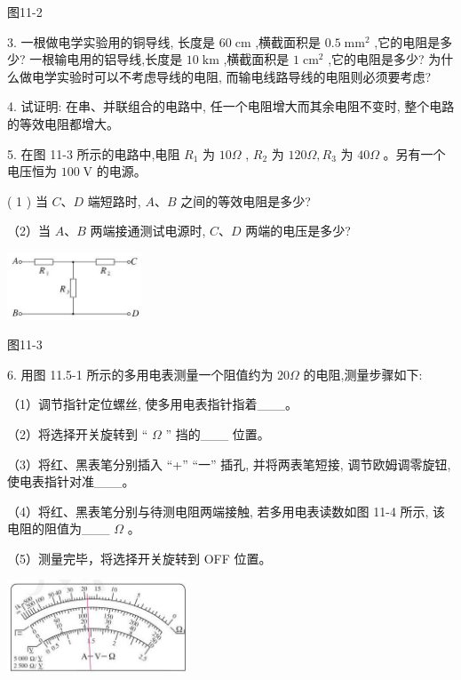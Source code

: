 \documentclass[10pt]{article}
\begin{document}
图11-2

3. 一根做电学实验用的铜导线, 长度是 \({60}\mathrm{\;{cm}}\) ,横截面积是 \({0.5}{\mathrm{\;{mm}}}^{2}\) ,它的电阻是多少? 一根输电用的铝导线,长度是 \({10}\mathrm{\;{km}}\) ,横截面积是 \(1{\mathrm{\;{cm}}}^{2}\) ,它的电阻是多少? 为什么做电学实验时可以不考虑导线的电阻, 而输电线路导线的电阻则必须要考虑?

4. 试证明: 在串、并联组合的电路中, 任一个电阻增大而其余电阻不变时, 整个电路的等效电阻都增大。

5. 在图 11-3 所示的电路中,电阻 \({R}_{1}\) 为 \({10\Omega }\) , \({R}_{2}\) 为 \({120\Omega },{R}_{3}\) 为 \({40\Omega }\) 。另有一个电压恒为 \({100}\mathrm{\;V}\) 的电源。

( 1 ) 当 \(C\text{、}D\) 端短路时, \(A\text{、}B\) 之间的等效电阻是多少?

（2）当 \(A\text{、}B\) 两端接通测试电源时, \(C\text{、}D\) 两端的电压是多少?

\begin{center}
\includegraphics[max width=0.3\textwidth]{images/01911d5f-8e38-70c0-b5b8-2b399bd115b6_80_379332.jpg}
\end{center}

图11-3

6. 用图 11.5-1 所示的多用电表测量一个阻值约为 \({20\Omega }\) 的电阻,测量步骤如下:

（1）调节指针定位螺丝, 使多用电表指针指着\_\_\_。

（2）将选择开关旋转到 “ \(\Omega\) ” 挡的\_\_\_ 位置。

（3）将红、黑表笔分别插入 “+” “一” 插孔, 并将两表笔短接, 调节欧姆调零旋钮, 使电表指针对准\_\_\_。

（4）将红、黑表笔分别与待测电阻两端接触, 若多用电表读数如图 11-4 所示, 该电阻的阻值为\_\_\_ \(\Omega\) 。

（5）测量完毕，将选择开关旋转到 OFF 位置。

\begin{center}
\includegraphics[max width=0.4\textwidth]{images/01911d5f-8e38-70c0-b5b8-2b399bd115b6_80_198086.jpg}
\end{center}
\end{document}
